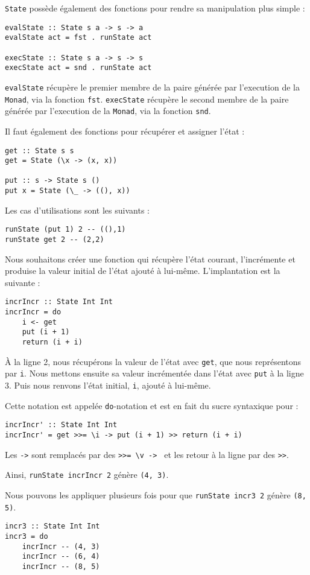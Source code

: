 \documentclass{llncs}
\begin{document}
\lstinline{State} possède également des fonctions pour rendre sa manipulation
plus simple :
\begin{lstlisting}
evalState :: State s a -> s -> a
evalState act = fst . runState act

execState :: State s a -> s -> s
execState act = snd . runState act
\end{lstlisting}
\lstinline{evalState} récupère le premier membre de la paire générée par l'execution
de la \lstinline{Monad}, via la fonction \lstinline{fst}.
\lstinline{execState} récupère le second membre de la paire générée par l'execution
de la \lstinline{Monad}, via la fonction \lstinline{snd}.

Il faut également des fonctions pour récupérer et assigner l'état :
\begin{lstlisting}
get :: State s s
get = State (\x -> (x, x))

put :: s -> State s ()
put x = State (\_ -> ((), x))
\end{lstlisting}

Les cas d'utilisations sont les suivants :
\begin{lstlisting}
runState (put 1) 2 -- ((),1)
runState get 2 -- (2,2)
\end{lstlisting}

Nous souhaitons créer une fonction qui récupère l'état courant,
l'incrémente et produise la valeur initial de l'état ajouté à lui-même.
L'implantation est la suivante :
\begin{lstlisting}
incrIncr :: State Int Int
incrIncr = do
    i <- get
    put (i + 1)
    return (i + i)
\end{lstlisting}
À la ligne 2, nous récupérons la valeur de l'état avec \lstinline{get}, que nous
représentons par \lstinline{i}.
Nous mettons ensuite sa valeur incrémentée dans l'état avec \lstinline{put} à la
ligne 3.
Puis nous renvons l'état initial, \lstinline{i}, ajouté à lui-même.

Cette notation est appelée \lstinline{do}-notation et est en fait du sucre syntaxique
pour :
\begin{lstlisting}
incrIncr' :: State Int Int
incrIncr' = get >>= \i -> put (i + 1) >> return (i + i)
\end{lstlisting}
Les \lstinline{->} sont remplacés par des \lstinline{>>= \v -> } et les retour à
la ligne par des \lstinline{>>}.

Ainsi, \lstinline{runState incrIncr 2} génère \lstinline{(4, 3)}.

Nous pouvons les appliquer plusieurs fois pour que \lstinline{runState incr3 2} génère \lstinline{(8, 5)}.
\begin{lstlisting}
incr3 :: State Int Int
incr3 = do
    incrIncr -- (4, 3)
    incrIncr -- (6, 4)
    incrIncr -- (8, 5)
\end{lstlisting}
\end{document}
